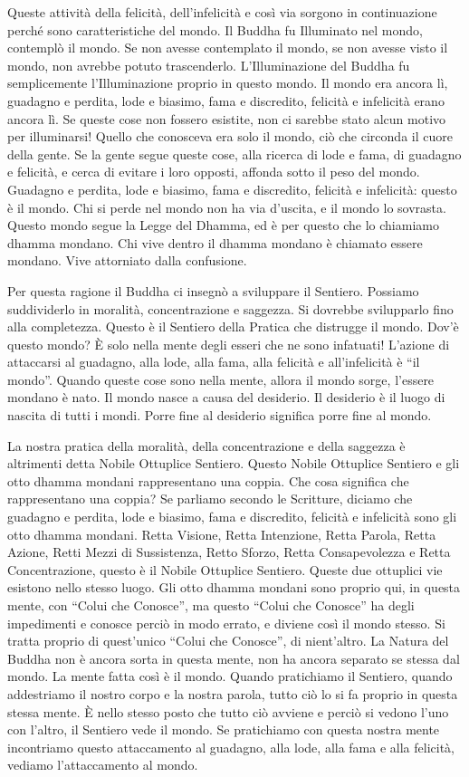 Queste attività della felicità, dell'infelicità e così via sorgono in
continuazione perché sono caratteristiche del mondo. Il Buddha fu
Illuminato nel mondo, contemplò il mondo. Se non avesse contemplato il
mondo, se non avesse visto il mondo, non avrebbe potuto trascenderlo.
L'Illuminazione del Buddha fu semplicemente l'Illuminazione proprio in
questo mondo. Il mondo era ancora lì, guadagno e perdita, lode e
biasimo, fama e discredito, felicità e infelicità erano ancora lì. Se
queste cose non fossero esistite, non ci sarebbe stato alcun motivo per
illuminarsi! Quello che conosceva era solo il mondo, ciò che circonda il
cuore della gente. Se la gente segue queste cose, alla ricerca di lode e
fama, di guadagno e felicità, e cerca di evitare i loro opposti, affonda
sotto il peso del mondo. Guadagno e perdita, lode e biasimo, fama e
discredito, felicità e infelicità: questo è il mondo. Chi si perde nel
mondo non ha via d'uscita, e il mondo lo sovrasta. Questo mondo segue la
Legge del Dhamma, ed è per questo che lo chiamiamo dhamma
mondano. Chi vive dentro il dhamma mondano è chiamato essere
mondano. Vive attorniato dalla confusione.

Per questa ragione il Buddha ci insegnò a sviluppare il Sentiero.
Possiamo suddividerlo in moralità, concentrazione e saggezza. Si
dovrebbe svilupparlo fino alla completezza. Questo è il Sentiero della
Pratica che distrugge il mondo. Dov'è questo mondo? È solo nella mente
degli esseri che ne sono infatuati! L'azione di attaccarsi al guadagno,
alla lode, alla fama, alla felicità e all'infelicità è ``il mondo''.
Quando queste cose sono nella mente, allora il mondo sorge, l'essere
mondano è nato. Il mondo nasce a causa del desiderio. Il desiderio è il
luogo di nascita di tutti i mondi. Porre fine al desiderio significa
porre fine al mondo.

La nostra pratica della moralità, della concentrazione e della saggezza
è altrimenti detta Nobile Ottuplice Sentiero. Questo Nobile Ottuplice
Sentiero e gli otto dhamma mondani rappresentano una coppia. Che
cosa significa che rappresentano una coppia? Se parliamo secondo le
Scritture, diciamo che guadagno e perdita, lode e biasimo, fama e
discredito, felicità e infelicità sono gli otto dhamma mondani.
Retta Visione, Retta Intenzione, Retta Parola, Retta Azione, Retti Mezzi
di Sussistenza, Retto Sforzo, Retta Consapevolezza e Retta
Concentrazione, questo è il Nobile Ottuplice Sentiero. Queste due
ottuplici vie esistono nello stesso luogo. Gli otto dhamma
mondani sono proprio qui, in questa mente, con ``Colui che Conosce'', ma
questo ``Colui che Conosce'' ha degli impedimenti e conosce perciò in
modo errato, e diviene così il mondo stesso. Si tratta proprio di
quest'unico ``Colui che Conosce'', di nient'altro. La Natura del Buddha
non è ancora sorta in questa mente, non ha ancora separato se stessa dal
mondo. La mente fatta così è il mondo. Quando pratichiamo il Sentiero,
quando addestriamo il nostro corpo e la nostra parola, tutto ciò lo si
fa proprio in questa stessa mente. È nello stesso posto che tutto ciò
avviene e perciò si vedono l'uno con l'altro, il Sentiero vede il mondo.
Se pratichiamo con questa nostra mente incontriamo questo attaccamento
al guadagno, alla lode, alla fama e alla felicità, vediamo
l'attaccamento al mondo.

